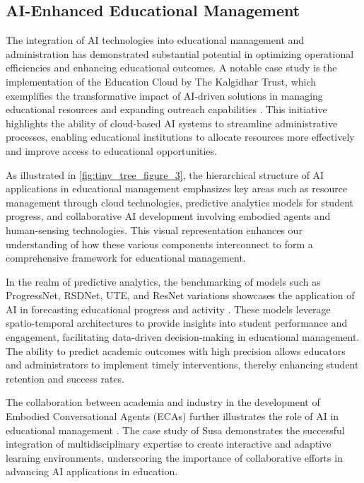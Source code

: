 \subsection{AI-Enhanced Educational Management} \label{subsec:AI-Enhanced Educational Management}

The integration of AI technologies into educational management and administration has demonstrated substantial potential in optimizing operational efficiencies and enhancing educational outcomes. A notable case study is the implementation of the Education Cloud by The Kalgidhar Trust, which exemplifies the transformative impact of AI-driven solutions in managing educational resources and expanding outreach capabilities \cite{lamba2011cloudcomputingfutureframework}. This initiative highlights the ability of cloud-based AI systems to streamline administrative processes, enabling educational institutions to allocate resources more effectively and improve access to educational opportunities.

As illustrated in \autoref{fig:tiny_tree_figure_3}, the hierarchical structure of AI applications in educational management emphasizes key areas such as resource management through cloud technologies, predictive analytics models for student progress, and collaborative AI development involving embodied agents and human-sensing technologies. This visual representation enhances our understanding of how these various components interconnect to form a comprehensive framework for educational management.

In the realm of predictive analytics, the benchmarking of models such as ProgressNet, RSDNet, UTE, and ResNet variations showcases the application of AI in forecasting educational progress and activity \cite{deboer2023progressactivityprogressprediction}. These models leverage spatio-temporal architectures to provide insights into student performance and engagement, facilitating data-driven decision-making in educational management. The ability to predict academic outcomes with high precision allows educators and administrators to implement timely interventions, thereby enhancing student retention and success rates.

The collaboration between academia and industry in the development of Embodied Conversational Agents (ECAs) further illustrates the role of AI in educational management \cite{korre2023takesvillagemultidisciplinaritycollaboration}. The case study of Susa demonstrates the successful integration of multidisciplinary expertise to create interactive and adaptive learning environments, underscoring the importance of collaborative efforts in advancing AI applications in education.

